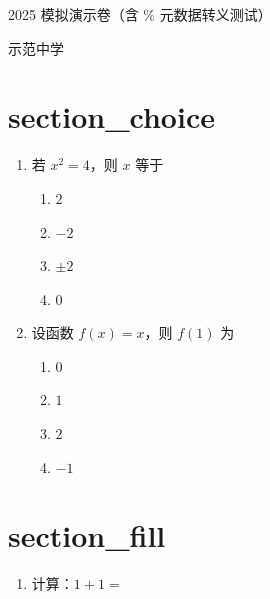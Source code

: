 \documentclass[UTF8,a4paper]{ctexart}
\begin{document}
\begin{center}
{\LARGE 2025 模拟演示卷（含 \% 元数据转义测试）\par}
\medskip
{\large 示范中学}
\end{center}
\vspace{1em}

\section*{section\_choice}
\begin{enumerate}[leftmargin=2em,itemsep=0.8em]

\item 若 $x^2=4$，则 $x$ 等于

\begin{enumerate}[label=\Alph*.,itemsep=0.2em,parsep=0pt]

\item $2$

\item $-2$

\item $\pm 2$

\item $0$

\end{enumerate}



\item 设函数 $f(x)=x$，则 $f(1)$ 为

\begin{enumerate}[label=\Alph*.,itemsep=0.2em,parsep=0pt]

\item $0$

\item $1$

\item $2$

\item $-1$

\end{enumerate}



\end{enumerate}
\vspace{1em}

\section*{section\_fill}
\begin{enumerate}[leftmargin=2em,itemsep=0.8em]

\item 计算：$1+1=$ \underline{\hspace{2cm}}



\end{enumerate}
\vspace{1em}
\end{document}
